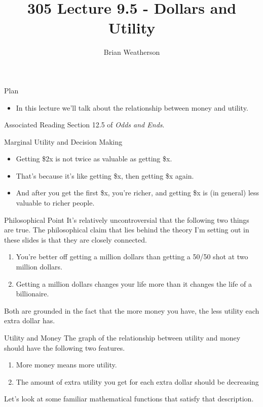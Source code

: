 \documentclass[
  ignorenonframetext,
]{beamer}
\title{305 Lecture 9.5 - Dollars and Utility}
\author{Brian Weatherson}
\date{}
\providecommand{\tightlist}{%
  \setlength{\itemsep}{0pt}\setlength{\parskip}{0pt}}
\renewcommand{\,}{\text{, }}
\begin{document}
\frame{\titlepage}

\begin{frame}{Plan}
\protect\hypertarget{plan}{}
\begin{itemize}
\tightlist
\item
  In this lecture we'll talk about the relationship between money and
  utility.
\end{itemize}
\end{frame}

\begin{frame}{Associated Reading}
\protect\hypertarget{associated-reading}{}
Section 12.5 of \emph{Odds and Ends}.
\end{frame}

\begin{frame}{Marginal Utility and Decision Making}
\protect\hypertarget{marginal-utility-and-decision-making}{}
\begin{itemize}
\tightlist
\item
  Getting \$2x is not twice as valuable as getting \$x.
\item
  That's because it's like getting \$x, then getting \$x again.
\item
  And after you get the first \$x, you're richer, and getting \$x is (in
  general) less valuable to richer people.
\end{itemize}
\end{frame}

\begin{frame}{Philosophical Point}
\protect\hypertarget{philosophical-point}{}
It's relatively uncontroversial that the following two things are true.
The philosophical claim that lies behind the theory I'm setting out in
these slides is that they are closely connected.

\begin{enumerate}
\tightlist
\item
  You're better off getting a million dollars than getting a 50/50 shot
  at two million dollars.
\item
  Getting a million dollars changes your life more than it changes the
  life of a billionaire.
\end{enumerate}

Both are grounded in the fact that the more money you have, the less
utility each extra dollar has.
\end{frame}

\begin{frame}{Utility and Money}
\protect\hypertarget{utility-and-money}{}
The graph of the relationship between utility and money should have the
following two features.

\begin{enumerate}
\tightlist
\item
  More money means more utility.
\item
  The amount of extra utility you get for each extra dollar should be
  decreasing
\end{enumerate}

Let's look at some familiar mathematical functions that satisfy that
description.
\end{frame}
\end{document}
